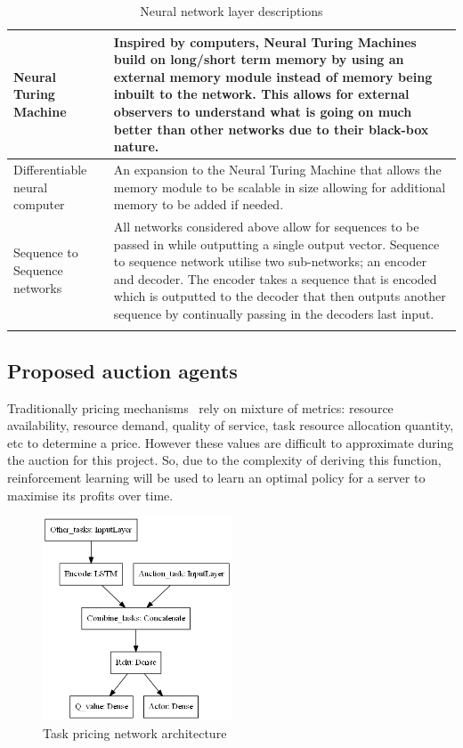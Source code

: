 \begin{longtable}{|p{3.5cm}|p{12cm}|}
    Neural Turing Machine~\citep{NTM} & Inspired by computers, Neural Turing Machines build on long/short term memory
        by using an external memory module instead of memory being inbuilt to the network. This allows for external
        observers to understand what is going on much better than other networks due to their black-box nature. \\ \hline

    Differentiable neural computer~\citep{DNC} & An expansion to the Neural Turing Machine that allows the memory
        module to be scalable in size allowing for additional memory to be added if needed. \\ \hline

    Sequence to Sequence networks~\cite{seq2seq} & All networks considered above allow for sequences to be passed in
        while outputting a single output vector. Sequence to sequence network utilise two sub-networks; an encoder and
        decoder. The encoder takes a sequence that is encoded which is outputted to the decoder that then outputs
        another sequence by continually passing in the decoders last input. \\ \hline
    \caption{Neural network layer descriptions}
    \label{tab:neural_network_layers}
\end{longtable}

\subsection{Proposed auction agents}\label{subsec:proposed-auction-agents}
Traditionally pricing mechanisms~\citep{al2013cloud} rely on mixture of metrics: resource availability, resource demand,
quality of service, task resource allocation quantity, etc to determine a price. However
these values are difficult to approximate during the auction for this project. So, due to the complexity of
deriving this function, reinforcement learning will be used to learn an optimal policy for a server to maximise its
profits over time.

\begin{figure}[H]
    \centering
    \includegraphics[width=0.5\textwidth]{figures/3_solution_figs/task_pricing_network_architecture.png}
    \caption{Task pricing network architecture}
    \label{fig:task_pricing_network_architecture}
\end{figure}

